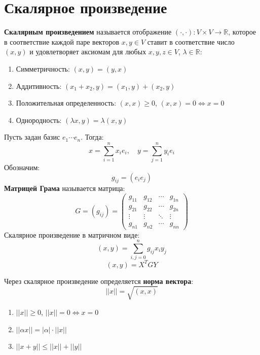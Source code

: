 \documentclass[14pt]{extreport}
\begin{document}
    \chapter{Скалярное произведение}
    \begin{defbox}
        \textbf{Скалярным произведением} называется отображение $(\cdot, \cdot):V \times V \rightarrow \mathbb{R}$, которое в соответствие каждой паре векторов $x, y \in V$ ставит в соответствие число $(x, y)$ и удовлетворяет аксиомам для любых $x, y, z \in V$, $\lambda \in \mathbb{R}$:
        \begin{enumerate}
            \item Симметричность: $(x, y) = (y, x)$
            \item Аддитивность: $(x_1 + x_2, y) = (x_1, y) + (x_2, y)$
            \item Положительная определенность: $(x, x) \ge 0$, $(x, x) = 0 \Leftrightarrow x = 0$
            \item Однородность: $(\lambda x, y) = \lambda (x, y)$
        \end{enumerate}
    \end{defbox}
    \begin{defbox}
        Пусть задан базис $e_1\cdots e_n$.  Тогда:
        $$
        x = \sum_{i=1}^n x_ie_i, \quad y = \sum_{j=1}^n y_ie_i
        $$
        Обозначим:
        $$
        g_{ij} = (e_ie_j)
        $$
        \textbf{Матрицей Грама} называется матрица:
        $$
        G = (g_{ij}) = \begin{pmatrix}
            g_{11} & g_{12} & \cdots & g_{1n}\\
            g_{21} & g_{22} & \cdots & g_{2n}\\
            \vdots & \vdots & \ddots & \vdots\\
            g_{n1} & g_{n2} & \cdots & g_{nn}
        \end{pmatrix}
        $$
        Скалярное произведение в матричном виде:
        $$
        (x, y) = \sum_{i,j=0}^n g_{ij}x_iy_j
        $$
        $$
        (x, y) = X^TGY
        $$ 
    \end{defbox}
    \begin{defbox}
        Через скалярное произведение определяется \textbf{норма вектора}:
        $$
        ||x|| = \sqrt{(x, x)}
        $$
        \begin{enumerate}
            \item $||x|| \ge 0$, $||x|| = 0 \Leftrightarrow x =0$
            \item $||\alpha x|| = |\alpha|\cdot||x||$
            \item $||x+y|| \le ||x|| + ||y||$
        \end{enumerate}
    \end{defbox}
\end{document}
